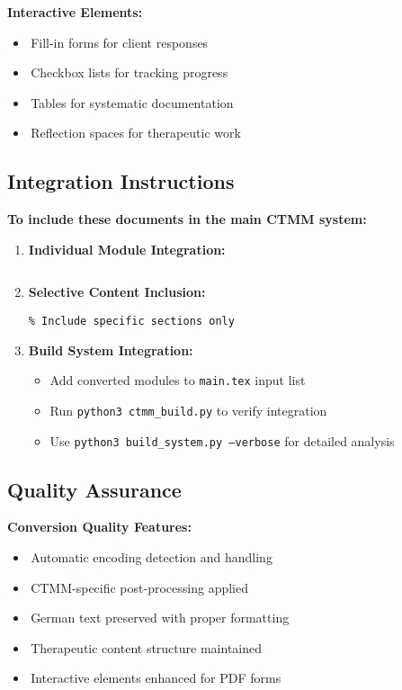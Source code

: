 \textbf{Interactive Elements:}
\begin{itemize}
    \item \checkbox\,Fill-in forms for client responses
    \item \checkbox\,Checkbox lists for tracking progress
    \item \checkbox\,Tables for systematic documentation
    \item \checkbox\,Reflection spaces for therapeutic work
\end{itemize}

\subsection{Integration Instructions}

\textbf{To include these documents in the main CTMM system:}

\begin{enumerate}
    \item \textbf{Individual Module Integration:}
    \begin{verbatim}

    \end{verbatim}
    
    \item \textbf{Selective Content Inclusion:}
    \begin{verbatim}
% Include specific sections only

    \end{verbatim}
    
    \item \textbf{Build System Integration:}
    \begin{itemize}
        \item Add converted modules to \texttt{main.tex} input list
        \item Run \texttt{python3 ctmm\_build.py} to verify integration
        \item Use \texttt{python3 build\_system.py --verbose} for detailed analysis
    \end{itemize}
\end{enumerate}

\subsection{Quality Assurance}

\textbf{Conversion Quality Features:}
\begin{itemize}
    \item \checkbox\,Automatic encoding detection and handling
    \item \checkbox\,CTMM-specific post-processing applied
    \item \checkbox\,German text preserved with proper formatting
    \item \checkbox\,Therapeutic content structure maintained
    \item \checkbox\,Interactive elements enhanced for PDF forms
\end{itemize}

